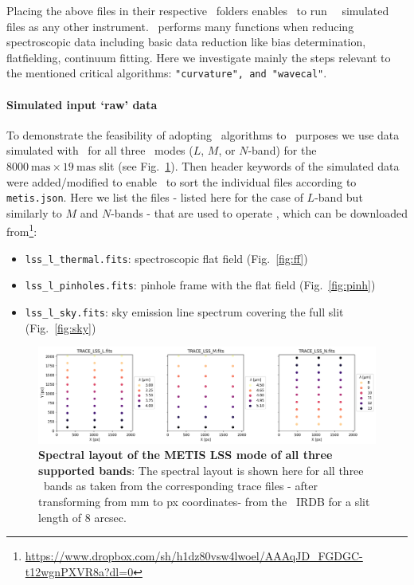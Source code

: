 Placing the above files in their respective \pyred~folders enables \pyred~to run \met~\scope~simulated files as any other instrument. \pyred~performs many functions when reducing spectroscopic data  including basic data reduction like bias determination, flatfielding, continuum fitting. Here we investigate mainly the steps relevant to the mentioned critical algorithms: \texttt{"curvature", and "wavecal"}.
\paragraph{Simulated input `raw' data}
To demonstrate the feasibility of adopting \pyred~algorithms to \met~purposes we use data simulated with \scope~for all three \lss~modes ($L$, $M$, or $N$-band) for the $8000~\mathrm{mas} \times 19~\mathrm{mas}$ slit (see Fig.~\ref{fig:lmn_layout}). 
Then header keywords of the simulated data were added/modified to enable \pyred~to sort the individual files according to \texttt{metis.json}. Here we list the files - listed here for the case of $L$-band but similarly to $M$ and $N$-bands - that are used to operate \pyred, which can be downloaded from\footnote{\url{https://www.dropbox.com/sh/h1dz80vsw4lwoel/AAAqJD_FGDGC-t12wgnPXVR8a?dl=0}}: 
\begin{itemize}
   \item \texttt{lss\_l\_thermal.fits}: spectroscopic flat field (Fig.~\ref{fig:ff})
   \item \texttt{lss\_l\_pinholes.fits}: pinhole frame with the flat field (Fig.~\ref{fig:pinh})
   \item \texttt{lss\_l\_sky.fits}: sky emission line spectrum covering the full slit (Fig.~\ref{fig:sky})
\end{itemize}

\begin{figure}[!ht]
  \centering
  \includegraphics[width=\textwidth]{figures/LSS_CrtAlg_files/METIS_LSS_SpectralLayout_px.png}
  \caption[Spectral layout of the METIS LSS mode]{\textbf{Spectral layout of the METIS LSS mode of all three supported bands}: The spectral layout is shown here for all three \lss~bands as taken from the corresponding trace files - after transforming from mm to px coordinates- from the \met~IRDB for a slit length of 8 arcsec.}

  \label{fig:lmn_layout}
\end{figure}

